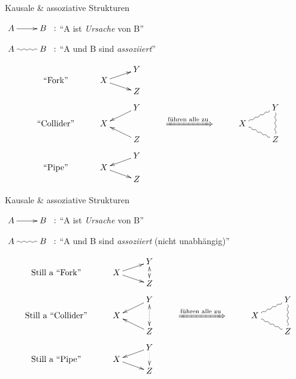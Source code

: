 \documentclass[
  10pt,
  ignorenonframetext,
]{beamer}
\begin{document}
\begin{frame}{Kausale \& assoziative Strukturen}
\label{kausale-assoziative-strukturen-2}
\begin{small}
$\xymatrix{A \ar[r] & B} \;:$ ``A ist \textit{Ursache} von B''   

$\xymatrix{A \ar@{~}[r] & B} \;:$ ``A und B sind \textit{assoziiert}''

\begin{displaymath}
    \xymatrix@R-2pc{
      &                   & Y &  & &\\
  \text{``Fork''} &  X \ar[dr]\ar[ur] &   &  & &\\
      &                   & Z &  & &\\
      &                   &   &  & &\\
      &                   & Y \ar[dl] & & & Y\ar@{~}[dd]\\
   \text{``Collider''}    &  X  &  & \xRightarrow{\text{führen alle zu}}  & X \ar@{~}[dr]\ar@{~}[ur] &\\
      &                   & Z \ar[ul] & & & Z\\
      &                   &   & & &\\
      &                   & Y \ar[dl] & & &\\
   \text{``Pipe''}   &  X \ar[dr]  &   & & &\\
      &                   & Z  & & &
}  
\end{displaymath}
\end{small}
\end{frame}

\begin{frame}{Kausale \& assoziative Strukturen}
\label{kausale-assoziative-strukturen-3}
\begin{small}
$\xymatrix{A \ar[r] & B} \;:$ ``A ist \textit{Ursache} von B''  

$\xymatrix{A \ar@{~}[r] & B}\;:$ ``A und B sind \textit{assoziiert} (nicht unabhängig)'' 

\begin{displaymath}
    \xymatrix@R-2pc{
      &                   & Y \ar@{<.>}[dd] &  & &\\
  \text{Still a ``Fork''} &  X \ar[dr]\ar[ur] &   &  & &\\
      &                   & Z &  & &\\
      &                   &   &  & &\\
      &                   & Y \ar[dl]\ar@{<.}[dd]\ar@{.>}[dd] & & & Y\ar@{~}[dd]\\
   \text{Still a ``Collider''} &  X  &  & \xRightarrow{\text{führen alle zu}}  & X \ar@{~}[dr]\ar@{~}[ur] &\\
      &                   & Z \ar[ul] & & & Z\\
      &                   &   & & &\\
      &                   & Y\ar[dl]\ar@{.>}[dd] & & &\\
   \text{Still a ``Pipe''}   &  X \ar[dr]  &   & & &\\
      &                   & Z  & & &
}  
\end{displaymath}
\end{small}
\end{frame}
\end{document}
